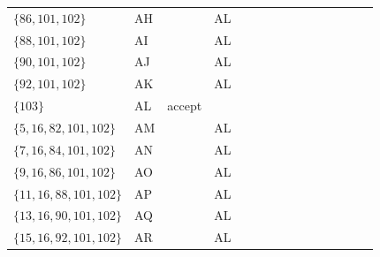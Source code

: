 \documentclass[a3paper]{report}
\begin{document}
\begin{landscape}
\begin{table}[h]
\begin{tabular}{| l | l | l | l | l | l | l | l | l | l | l | l | l | l | l |}
            $\{86,101,102\}$                                                                 & AH        &        & AL &    &    &    &    &    &    &    &    &    &    &            \\
            $\{88,101,102\}$                                                                 & AI        &        & AL &    &    &    &    &    &    &    &    &    &    &            \\
            $\{90,101,102\}$                                                                 & AJ        &        & AL &    &    &    &    &    &    &    &    &    &    &            \\
            $\{92,101,102\}$                                                                 & AK        &        & AL &    &    &    &    &    &    &    &    &    &    &            \\
            $\{103\}$                                                                        & AL        & accept &    &    &    &    &    &    &    &    &    &    &    &            \\
            $\{5,16,82,101,102\}$                                                            & AM        &        & AL &    &    &    &    &    &    &    &    &    &    &            \\
            $\{7,16,84,101,102\}$                                                            & AN        &        & AL &    &    &    &    &    &    &    &    &    &    &            \\
            $\{9,16,86,101,102\}$                                                            & AO        &        & AL &    &    &    &    &    &    &    &    &    &    &            \\
            $\{11,16,88,101,102\}$                                                           & AP        &        & AL &    &    &    &    &    &    &    &    &    &    &            \\
            $\{13,16,90,101,102\}$                                                           & AQ        &        & AL &    &    &    &    &    &    &    &    &    &    &            \\
            $\{15,16,92,101,102\}$                                                           & AR        &        & AL &    &    &    &    &    &    &    &    &    &    &            \\
            \hline
        \end{tabular}
    \end{table}

\end{landscape}
\end{document}
